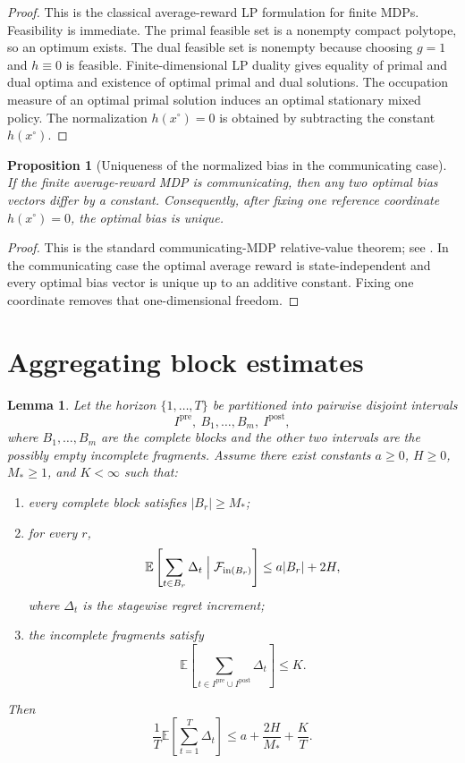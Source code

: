 \documentclass[12pt]{article}
\newtheorem{proposition}[theorem]{Proposition}
\newtheorem{lemma}[theorem]{Lemma}
\theoremstyle{definition}
\newcommand{\E}{\mathbb{E}}
\newcommand{\1}{\mathbf{1}}
\newcommand{\cF}{\mathcal{F}}
\begin{document}
\begin{proof}
This is the classical average-reward LP formulation for finite MDPs. Feasibility is
immediate. The primal feasible set is a nonempty compact polytope, so an optimum
exists. The dual feasible set is nonempty because choosing $g=1$ and $h\equiv 0$
is feasible. Finite-dimensional LP duality gives equality of primal and dual
optima and existence of optimal primal and dual solutions. The occupation measure
of an optimal primal solution induces an optimal stationary mixed policy. The
normalization $h(x^\circ)=0$ is obtained by subtracting the constant $h(x^\circ)$.
\end{proof}

\begin{proposition}[Uniqueness of the normalized bias in the communicating case]
\label{prop:bias-unique}
If the finite average-reward MDP is communicating, then any two optimal bias
vectors differ by a constant. Consequently, after fixing one reference coordinate
$h(x^\circ)=0$, the optimal bias is unique.
\end{proposition}

\begin{proof}
This is the standard communicating-MDP relative-value theorem; see
\cite[Chapter~8]{Puterman1994}. In the communicating case the optimal average
reward is state-independent and every optimal bias vector is unique up to an
additive constant. Fixing one coordinate removes that one-dimensional freedom.
\end{proof}

\section{Aggregating block estimates}
\label{app:aggregation}

\begin{lemma}
\label{lem:aggregation}
Let the horizon $\{1,\dots,T\}$ be partitioned into pairwise disjoint intervals
\[
I^{\mathrm{pre}},\ B_1,\dots,B_m,\ I^{\mathrm{post}},
\]
where $B_1,\dots,B_m$ are the complete blocks and the other two intervals are the
possibly empty incomplete fragments. Assume there exist constants $a\ge 0$, $H\ge
0$, $M_*\ge 1$, and $K<\infty$ such that:
\begin{enumerate}[label=\textnormal{(\roman*)},leftmargin=2.6em]
\item every complete block satisfies $|B_r|\ge M_*$;
\item for every $r$,
\[
\E\left[\sum_{t\in B_r}\Delta_t\Bigm|\cF_{\mathrm{in}(B_r)}\right]
\le a|B_r|+2H,
\]
where $\Delta_t$ is the stagewise regret increment;
\item the incomplete fragments satisfy
\[
\E\left[\sum_{t\in I^{\mathrm{pre}}\cup I^{\mathrm{post}}}\Delta_t\right]\le K.
\]
\end{enumerate}
Then
\[
\frac1T\E\left[\sum_{t=1}^T\Delta_t\right]
\le a + \frac{2H}{M_*}+\frac{K}{T}.
\]
\end{lemma}
\end{document}
